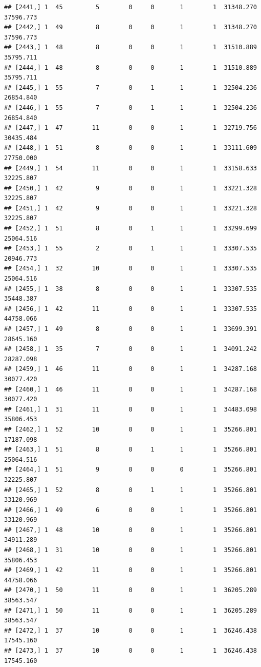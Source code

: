 \documentclass[
]{article}
\begin{document}
\begin{verbatim}
## [2441,] 1  45         5        0     0       1        1  31348.270  37596.773
## [2442,] 1  49         8        0     0       1        1  31348.270  37596.773
## [2443,] 1  48         8        0     0       1        1  31510.889  35795.711
## [2444,] 1  48         8        0     0       1        1  31510.889  35795.711
## [2445,] 1  55         7        0     1       1        1  32504.236  26854.840
## [2446,] 1  55         7        0     1       1        1  32504.236  26854.840
## [2447,] 1  47        11        0     0       1        1  32719.756  30435.484
## [2448,] 1  51         8        0     0       1        1  33111.609  27750.000
## [2449,] 1  54        11        0     0       1        1  33158.633  32225.807
## [2450,] 1  42         9        0     0       1        1  33221.328  32225.807
## [2451,] 1  42         9        0     0       1        1  33221.328  32225.807
## [2452,] 1  51         8        0     1       1        1  33299.699  25064.516
## [2453,] 1  55         2        0     1       1        1  33307.535  20946.773
## [2454,] 1  32        10        0     0       1        1  33307.535  25064.516
## [2455,] 1  38         8        0     0       1        1  33307.535  35448.387
## [2456,] 1  42        11        0     0       1        1  33307.535  44758.066
## [2457,] 1  49         8        0     0       1        1  33699.391  28645.160
## [2458,] 1  35         7        0     0       1        1  34091.242  28287.098
## [2459,] 1  46        11        0     0       1        1  34287.168  30077.420
## [2460,] 1  46        11        0     0       1        1  34287.168  30077.420
## [2461,] 1  31        11        0     0       1        1  34483.098  35806.453
## [2462,] 1  52        10        0     0       1        1  35266.801  17187.098
## [2463,] 1  51         8        0     1       1        1  35266.801  25064.516
## [2464,] 1  51         9        0     0       0        1  35266.801  32225.807
## [2465,] 1  52         8        0     1       1        1  35266.801  33120.969
## [2466,] 1  49         6        0     0       1        1  35266.801  33120.969
## [2467,] 1  48        10        0     0       1        1  35266.801  34911.289
## [2468,] 1  31        10        0     0       1        1  35266.801  35806.453
## [2469,] 1  42        11        0     0       1        1  35266.801  44758.066
## [2470,] 1  50        11        0     0       1        1  36205.289  38563.547
## [2471,] 1  50        11        0     0       1        1  36205.289  38563.547
## [2472,] 1  37        10        0     0       1        1  36246.438  17545.160
## [2473,] 1  37        10        0     0       1        1  36246.438  17545.160

\end{verbatim}
\end{document}
